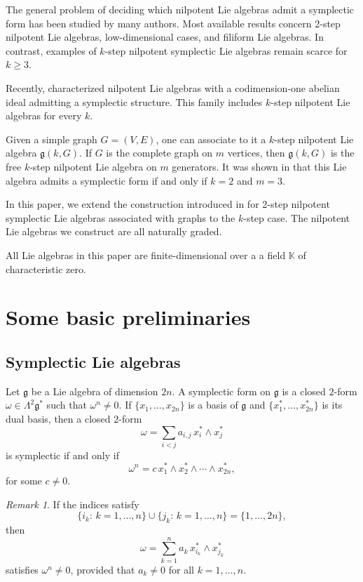 \documentclass[a4paper,11pt]{amsart}
\theoremstyle{definition}
\theoremstyle{remark}
\newtheorem{remark}[theorem]{Remark}
\numberwithin{equation}{section}
\newcommand{\g}{\mathfrak{g}}
\newcommand{\K}{\mathbb{K}}
\begin{document}
The general problem of deciding which nilpotent Lie algebras admit a symplectic form has been studied by many authors. Most available results concern 2-step nilpotent Lie algebras, low-dimensional cases, and filiform Lie algebras. In contrast, examples of $k$-step nilpotent symplectic Lie algebras remain scarce for $k \ge 3$.

Recently, \cite{ABDGH} characterized nilpotent Lie algebras with a codimension-one abelian ideal admitting a symplectic structure. This family includes $k$-step nilpotent Lie algebras for every $k$.

Given a simple graph $G=(V,E)$, one can associate to it a $k$-step nilpotent Lie algebra $\g(k,G)$. If $G$ is the complete graph on $m$ vertices, then $\g(k,G)$ is the free $k$-step nilpotent Lie algebra on $m$ generators. It was shown in \cite{D} that this Lie algebra admits a symplectic form if and only if $k=2$ and $m=3$.

In this paper, we extend the construction introduced in \cite{PT} for 2-step nilpotent symplectic Lie algebras 
associated with graphs to the $k$-step case. 
The nilpotent Lie algebras we construct are all naturally graded. 

All Lie algebras in this paper are finite-dimensional over a a field $\K$ of characteristic zero.




\section{Some basic preliminaries}

\subsection{Symplectic Lie algebras}\label{subsec:sym}

Let $\g$ be a Lie algebra of dimension $2n$.
A symplectic form on $\g$ is a closed $2$-form $\omega\in \Lambda^2 \g^*$ such that $\omega^n\ne 0$.
If $\{x_1,\dots,x_{2n}\}$ is a basis of $\g$ and $\{x^*_1,\dots,x^*_{2n}\}$ is its dual basis, then a closed $2$-form
\[
\omega=\sum_{i<j} a_{i,j}\, x^*_i \wedge x^*_j
\]
is symplectic if and only if
\[
\omega^n = c\, x^*_1 \wedge x^*_2 \wedge \cdots \wedge x^*_{2n},
\]
for some $c\ne 0$.

\begin{remark}\label{rmk:sym1}
If the indices satisfy
\[
\{i_k:\, k=1,\dots,n\}\cup \{j_k:\, k=1,\dots,n\}=\{1,\dots,2n\},
\]
then
\begin{equation}\label{eqn:sym-form}
\omega = \sum_{k=1}^n a_k\, x^*_{i_k}\wedge x^*_{j_k}
\end{equation}
satisfies $\omega^n\ne 0$, provided that $a_k\ne 0$ for all $k=1,\dots,n$.
\end{remark}
\end{document}
